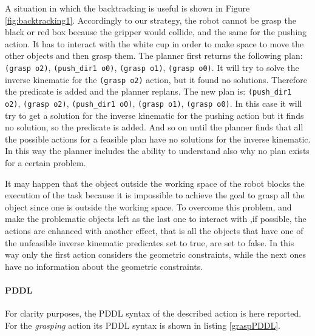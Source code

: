 A situation in which the backtracking is useful is shown in Figure \ref{fig:backtracking1}. Accordingly to our strategy, the robot cannot be grasp the black or red box because the gripper would collide, and the same for the pushing action. It has to interact with the white cup in order to make space to move the other objects and then grasp them. The planner first returns the following plan: \texttt{(grasp o2)}, \texttt{(push\_dir1 o0)}, \texttt{(grasp o1)}, \texttt{(grasp o0)}. It will try to solve the inverse kinematic for the \texttt{(grasp o2)} action, but it found no solutions. Therefore the predicate  is added and the planner replans. The new plan is: \texttt{(push\_dir1 o2)}, \texttt{(grasp o2)}, \texttt{(push\_dir1 o0)}, \texttt{(grasp o1)}, \texttt{(grasp o0)}. In this case it will try to get a solution for the inverse kinematic for the pushing action but it finds no solution, so the predicate  is added. And so on until the planner finds that all the possible actions for a feasible plan have no solutions for the inverse kinematic. In this way the planner includes the ability to understand also why no plan exists for a certain problem. 

It may happen that the object outside the working space of the robot blocks the execution of the task because it is impossible to achieve the goal to grasp all the object since one is outside the working space.
To overcome this problem, and make the problematic objects left as the last one to interact with ,if possible, the actions are enhanced with another effect, that is all the objects that have one of the unfeasible inverse kinematic predicates set to true, are set to false. In this way only the first action considers the geometric constraints, while the next ones have no information about the geometric constraints. 

\paragraph{PDDL}
For clarity purposes, the PDDL syntax of the described action is here reported. 
For the \textit{grasping} action its PDDL syntax is shown in listing \ref{graspPDDL}.

